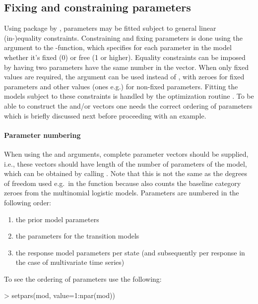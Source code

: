 \documentclass[article]{jss}
\begin{document}
\subsection{Fixing and constraining parameters}

Using package  by \citet{Tamura2009}, parameters may be
fitted subject to general linear (in-)equality constraints.
Constraining and fixing parameters is done using the 
argument to the -function, which specifies for each
parameter in the model whether it's fixed (0) or free (1 or higher).
Equality constraints can be imposed by having two parameters have the
same number in the  vector.  When only fixed values are
required, the  argument can be used instead of
, with zeroes for fixed parameters and other values (ones
e.g.) for non-fixed parameters.  Fitting the models subject to these
constraints is handled by the optimization routine .  To
be able to construct the  and/or  vectors one
needs the correct ordering of parameters which is briefly discussed
next before proceeding with an example.

\paragraph{Parameter numbering} When using the  and
 arguments, complete parameter vectors should be supplied,
i.e., these vectors should have length of the number of parameters of
the model, which can be obtained by calling .  Note
that this is not the same as the degrees of freedom used e.g.\ in the
 function because  also counts the baseline
category zeroes from the multinomial logistic models.  Parameters are
numbered in the following order:
\begin{enumerate}
	\item  the prior model parameters
	\item  the parameters for the transition models
	\item  the response model parameters per state (and subsequently
	per response in the case of multivariate time series)
\end{enumerate}

To see the ordering of parameters use the following:
\begin{CodeChunk}
\begin{CodeInput}
> setpars(mod, value=1:npar(mod))
\end{CodeInput}
\end{CodeChunk}
\end{document}
